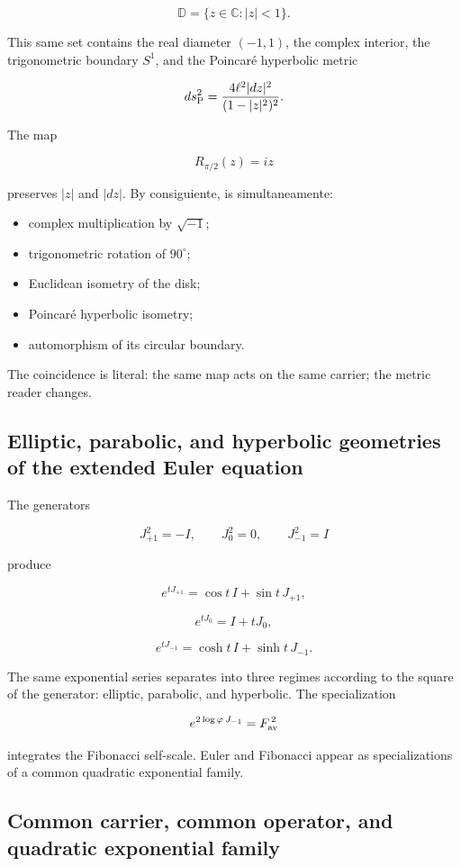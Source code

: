 \[
\mathbb D=\{z\in\mathbb C:|z|<1\}.
\]

This same set contains the real diameter \((-1,1)\), the complex
interior, the trigonometric boundary \(S^1\), and the Poincaré
hyperbolic metric

\[
ds_{\rm P}^2=\frac{4\ell^2|dz|^2}{(1-|z|^2)^2}.
\]

The map

\[
R_{\pi/2}(z)=iz
\]

preserves \(|z|\) and \(|dz|\). By consiguiente, is simultaneamente:

\begin{itemize}
\item complex multiplication by \(\sqrt{-1}\);
\item trigonometric rotation of \(90^\circ\);
\item Euclidean isometry of the disk;
\item Poincaré hyperbolic isometry;
\item automorphism of its circular boundary.
\end{itemize}

The coincidence is literal: the same map acts on the same carrier; the metric reader changes.

\subsection{Elliptic, parabolic, and hyperbolic geometries of the extended Euler equation}

The generators

\[
J_{+1}^2=-I,\qquad
J_0^2=0,\qquad
J_{-1}^2=I
\]

produce

\[
e^{tJ_{+1}}=\cos t\,I+\sin t\,J_{+1},
\]

\[
e^{tJ_0}=I+tJ_0,
\]

\[
e^{tJ_{-1}}=\cosh t\,I+\sinh t\,J_{-1}.
\]

The same exponential series separates into three regimes according to the
square of the generator: elliptic, parabolic, and hyperbolic. The
specialization

\[
e^{2\log\varphi\,J_{-1}}=F_{\rm av}^{\,2}
\]

integrates the Fibonacci self-scale. Euler and Fibonacci appear as
specializations of a common quadratic exponential family.

\subsection{Common carrier, common operator, and quadratic exponential family}

